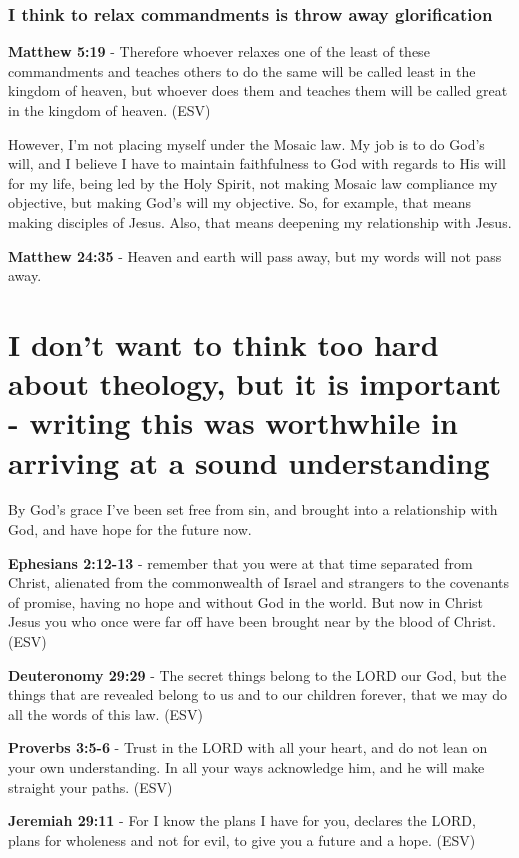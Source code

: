 \documentclass[11pt]{article}
\begin{document}
\subsubsection{I think to relax commandments is throw away glorification}
\label{sec:org5be395e}
\textbf{Matthew 5:19} - Therefore whoever relaxes one of the least of these commandments and teaches others to do the same will be called least in the kingdom of heaven, but whoever does them and teaches them will be called great in the kingdom of heaven. (ESV)

However, I'm not placing myself under the Mosaic law.
My job is to do God's will, and I believe I have to maintain faithfulness to God with regards to His will for my life,
being led by the Holy Spirit, not making Mosaic law compliance my objective, but making God's will my objective.
So, for example, that means making disciples of Jesus.
Also, that means deepening my relationship with Jesus.

\textbf{Matthew 24:35} - Heaven and earth will pass away, but my words will not pass away.

\section{I don't want to think too hard about theology, but it is important - writing this was worthwhile in arriving at a sound understanding}
\label{sec:org02cd13b}
By God's grace I've been set free from sin, and brought into a relationship with God, and have hope for the future now.

\textbf{Ephesians 2:12-13} -  remember that you were at that time separated from Christ, alienated from the commonwealth of Israel and strangers to the covenants of promise, having no hope and without God in the world.  But now in Christ Jesus you who once were far off have been brought near by the blood of Christ.  (ESV)

\textbf{Deuteronomy 29:29} -  The secret things belong to the LORD our God, but the things that are revealed belong to us and to our children forever, that we may do all the words of this law.  (ESV)

\textbf{Proverbs 3:5-6} - Trust in the LORD with all your heart, and do not lean on your own understanding. In all your ways acknowledge him, and he will make straight your paths. (ESV)

\textbf{Jeremiah 29:11} -  For I know the plans I have for you, declares the LORD, plans for wholeness and not for evil, to give you a future and a hope.  (ESV)
\end{document}
